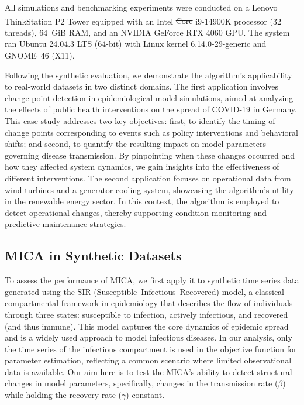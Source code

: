 \documentclass[10pt,letterpaper]{article}
\makeatletter
\providecommand{\DIFaddtex}[1]{{\protect\color{blue}\uwave{#1}}} %
\providecommand{\DIFdeltex}[1]{{\protect\color{red}\sout{#1}}} %
\providecommand{\DIFaddbegin}{} %
\providecommand{\DIFaddend}{} %
\providecommand{\DIFdelbegin}{} %
\providecommand{\DIFdelend}{} %
\providecommand{\DIFadd}[1]{\texorpdfstring{\DIFaddtex{#1}}{#1}} %
\providecommand{\DIFdel}[1]{\texorpdfstring{\DIFdeltex{#1}}{}} %
\providecommand{\DIFscaledelfig}{0.5}
\newlength{\DIFdelgraphicswidth} %
\newlength{\DIFdelgraphicsheight} %
\providecommand{\DIFaddincludegraphics}[2][]{{\color{blue}\fbox{\DIFOincludegraphics[#1]{#2}}}} %
\providecommand{\DIFdelincludegraphics}[2][]{%
\sbox{\DIFdelgraphicsbox}{\DIFOincludegraphics[#1]{#2}}%
\settoboxwidth{\DIFdelgraphicswidth}{\DIFdelgraphicsbox} %
\settoboxtotalheight{\DIFdelgraphicsheight}{\DIFdelgraphicsbox} %
\scalebox{\DIFscaledelfig}{%
\parbox[b]{\DIFdelgraphicswidth}{\usebox{\DIFdelgraphicsbox}\\[-\baselineskip] \rule{\DIFdelgraphicswidth}{0em}}\llap{\resizebox{\DIFdelgraphicswidth}{\DIFdelgraphicsheight}{%
\setlength{\unitlength}{\DIFdelgraphicswidth}%
\begin{picture}(1,1)%
\thicklines\linethickness{2pt} %
{\color[rgb]{1,0,0}\put(0,0){\framebox(1,1){}}}%
{\color[rgb]{1,0,0}\put(0,0){\line( 1,1){1}}}%
{\color[rgb]{1,0,0}\put(0,1){\line(1,-1){1}}}%
\end{picture}%
}\hspace*{3pt}}} %
} %
\DeclareRobustCommand{\DIFaddbegin}{\DIFOaddbegin \let\includegraphics\DIFaddincludegraphics} %
\DeclareRobustCommand{\DIFaddend}{\DIFOaddend \let\includegraphics\DIFOincludegraphics} %
\DeclareRobustCommand{\DIFdelbegin}{\DIFOdelbegin \let\includegraphics\DIFdelincludegraphics} %
\DeclareRobustCommand{\DIFdelend}{\DIFOaddend \let\includegraphics\DIFOincludegraphics} %
\let\sout@orig\sout %
\renewcommand{\sout}[1]{\ifmmode\text{\sout@orig{\ensuremath{#1}}}\else\sout@orig{#1}\fi} %
\makeatother
\begin{document}
All simulations and benchmarking experiments were conducted on a Lenovo ThinkStation P2 Tower equipped with an Intel \DIFdelbegin \DIFdel{\textsuperscript{\textregistered} Core \texttrademark{} }\DIFdelend \DIFaddbegin \DIFadd{Core }\DIFaddend i9-14900K processor (32 threads), 64~GiB RAM, and an NVIDIA GeForce RTX \DIFdelbegin \DIFdel{\texttrademark{} }\DIFdelend 4060 GPU. The system ran Ubuntu 24.04.3 LTS (64-bit) with Linux kernel 6.14.0-29-generic and GNOME~46 (X11). 

Following the synthetic evaluation, we demonstrate the algorithm’s applicability to real-world datasets in two distinct domains. The first application involves change point detection in epidemiological model simulations, aimed at analyzing the effects of public health interventions on the spread of COVID-19 in Germany. This case study addresses two key objectives: first, to identify the timing of change points corresponding to events such as policy interventions and behavioral shifts; and second, to quantify the resulting impact on model parameters governing disease transmission. By pinpointing when these changes occurred and how they affected system dynamics, we gain insights into the effectiveness of different interventions. The second application focuses on operational data from wind turbines and a generator cooling system, showcasing the algorithm’s utility in the renewable energy sector. In this context, the algorithm is employed to detect operational changes, thereby supporting condition monitoring and predictive maintenance strategies. 

\subsection*{MICA in Synthetic Datasets}
To assess the performance of MICA, we first apply it to synthetic time series data generated using the SIR (Susceptible–Infectious–Recovered) model, a classical compartmental framework in epidemiology that describes the flow of individuals through three states: susceptible to infection, actively infectious, and recovered (and thus immune). This model captures the core dynamics of epidemic spread and is a widely used approach to model infectious diseases. In our analysis, only the time series of the infectious compartment is used in the objective function for parameter estimation, reflecting a common scenario where limited observational data is available. 
Our aim here is to test the MICA's ability to detect structural changes in model parameters, specifically, changes in the transmission rate (\(\beta\)) while holding the recovery rate (\(\gamma\)) constant.
\end{document}
